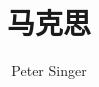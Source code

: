 \documentclass{ctexart}
\begin{document}
	\title{马克思}
	\author{Peter Singer}
	\date{}
	\maketitle
	\clearpage
	\tableofcontents
	
	
\end{document}
